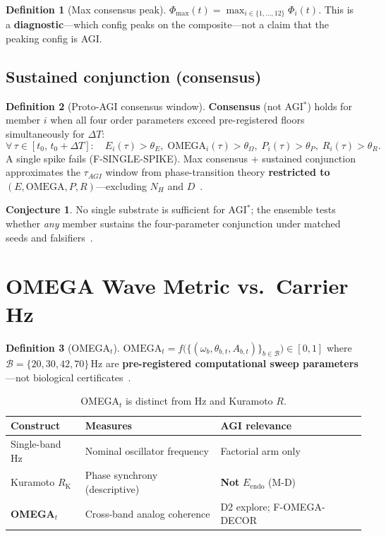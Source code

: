\documentclass[11pt,a4paper]{article}
\theoremstyle{definition}
\newtheorem{definition}{Definition}
\newtheorem{conjecture}{Conjecture}
\begin{document}
\begin{definition}[Max consensus peak]
$\Phi_{\max}(t) = \max_{i\in\{1,\ldots,12\}} \Phi_i(t)$. This is a \textbf{diagnostic}---which config peaks on the composite---not a claim that the peaking config is AGI.
\end{definition}

\subsection{Sustained conjunction (consensus)}

\begin{definition}[Proto-AGI consensus window]
\textbf{Consensus} (not AGI$^{*}$) holds for member $i$ when all four order parameters exceed pre-registered floors simultaneously for $\Delta T$:
\begin{equation}
\forall\, \tau \in [t_0,\, t_0+\Delta T]:\quad
E_i(\tau) > \theta_E,\;
\mathrm{OMEGA}_i(\tau) > \theta_\Omega,\;
P_i(\tau) > \theta_P,\;
R_i(\tau) > \theta_R.
\end{equation}
A single spike fails (F-SINGLE-SPIKE). Max consensus + sustained conjunction approximates the $\tau_{AGI}$ window from phase-transition theory \textbf{restricted to} $(E,\mathrm{OMEGA},P,R)$---excluding $N_H$ and $D$~\cite{kuznetsov2026phase}.
\end{definition}

\begin{conjecture}
No single substrate is sufficient for AGI$^{*}$; the ensemble tests whether \emph{any} member sustains the four-parameter conjunction under matched seeds and falsifiers~\cite{kuznetsov2026proto}.
\end{conjecture}

\section{OMEGA Wave Metric vs.\ Carrier Hz}\label{sec:omega}

\begin{definition}[OMEGA$_t$]
$\mathrm{OMEGA}_t = f\big(\{(\omega_b, \theta_{b,t}, A_{b,t})\}_{b \in \mathcal{B}}\big) \in [0,1]$ where $\mathcal{B}=\{20,30,42,70\}$\,Hz are \textbf{pre-registered computational sweep parameters}---not biological certificates~\cite{kuznetsov2026omega}.
\end{definition}

\begin{table}[H]
\centering\small
\begin{tabular}{lp{5.5cm}p{3.5cm}}
\toprule Construct & Measures & AGI relevance \\ \midrule
Single-band Hz & Nominal oscillator frequency & Factorial arm only \\
Kuramoto $R_{\mathrm{K}}$ & Phase synchrony (descriptive) & \textbf{Not} $E_{\mathrm{endo}}$ (M-D) \\
\textbf{OMEGA$_t$} & Cross-band analog coherence & D2 explore; F-OMEGA-DECOR \\ \bottomrule
\end{tabular}
\caption{OMEGA$_t$ is distinct from Hz and Kuramoto $R$.}
\label{tab:omega-vs-hz}
\end{table}
\end{document}

